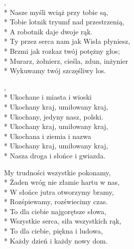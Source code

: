 
\begin{lyrics}[longestline={Murarz, żołnierz, cieśla, zdun, inżynier}]

,\\*
Nasze myśli wciąż przy tobie są,\\*
Tobie lotnik tryumf nad przestrzenią,\\*
A robotnik daje dwoje rąk.\\*
Ty przez serca nam jak Wisła płyniesz,\\*
Brzmi jak rozkaz twój potężny głos;\\*
Murarz, żołnierz, cieśla, zdun, inżynier\\*
Wykuwamy twój szczęśliwy los.

\begin{chorus}
,\\*
Ukochane i miasta i wioski\\*
Ukochany kraj, umiłowany kraj,\\*
Ukochany, jedyny nasz, polski.\\*
Ukochany kraj, umiłowany kraj,\\*
Ukochana i ziemia i nazwa\\*
Ukochany kraj, umiłowany kraj,\\*
Nasza droga i słońce i gwiazda.
\end{chorus}

My trudności wszystkie pokonamy,\\*
Żaden wróg nie złamie hartu w nas,\\*
W słońce jutra otworzymy bramy,\\*
Rozśpiewamy, rozświecimy czas.\\*
To dla ciebie najgorętsze słowa,\\*
Wszystkie serca, siła wszystkich rąk,\\*
To dla ciebie, piękna i ludowa,\\*
Każdy dzień i każdy nowy dom.

\chorusref
\end{lyrics}




